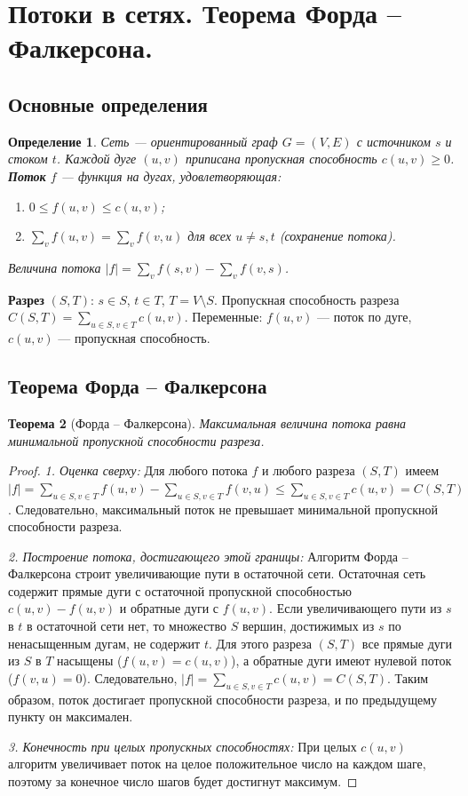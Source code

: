 \documentclass{article}
\theoremstyle{plain}
\newtheorem{theorem}{Теорема}[section]
\newtheorem{definition}[theorem]{Определение}
\begin{document}
\section{Потоки в сетях. Теорема Форда – Фалкерсона.}
\subsection{Основные определения}
\begin{definition}
Сеть — ориентированный граф $G=(V,E)$ с источником $s$ и стоком $t$. Каждой дуге $(u,v)$ приписана пропускная способность $c(u,v) \ge 0$. \textbf{Поток} $f$ — функция на дугах, удовлетворяющая:
\begin{enumerate}
\item $0 \le f(u,v) \le c(u,v)$;
\item $\sum_{v} f(u,v) = \sum_{v} f(v,u)$ для всех $u \neq s,t$ (сохранение потока).
\end{enumerate}
Величина потока $|f| = \sum_{v} f(s,v) - \sum_{v} f(v,s)$.
\end{definition}

\textbf{Разрез} $(S,T)$: $s \in S$, $t \in T$, $T = V \setminus S$. Пропускная способность разреза $C(S,T) = \sum_{u\in S, v\in T} c(u,v)$. Переменные: $f(u,v)$ — поток по дуге, $c(u,v)$ — пропускная способность.

\subsection{Теорема Форда – Фалкерсона}
\begin{theorem}[Форда – Фалкерсона]
Максимальная величина потока равна минимальной пропускной способности разреза.
\end{theorem}
\begin{proof}
\textit{1. Оценка сверху:} Для любого потока $f$ и любого разреза $(S,T)$ имеем $|f| = \sum_{u\in S, v\in T} f(u,v) - \sum_{u\in S, v\in T} f(v,u) \le \sum_{u\in S, v\in T} c(u,v) = C(S,T)$. Следовательно, максимальный поток не превышает минимальной пропускной способности разреза.

\textit{2. Построение потока, достигающего этой границы:} Алгоритм Форда – Фалкерсона строит увеличивающие пути в остаточной сети. Остаточная сеть содержит прямые дуги с остаточной пропускной способностью $c(u,v)-f(u,v)$ и обратные дуги с $f(u,v)$. Если увеличивающего пути из $s$ в $t$ в остаточной сети нет, то множество $S$ вершин, достижимых из $s$ по ненасыщенным дугам, не содержит $t$. Для этого разреза $(S,T)$ все прямые дуги из $S$ в $T$ насыщены ($f(u,v)=c(u,v)$), а обратные дуги имеют нулевой поток ($f(v,u)=0$). Следовательно, $|f| = \sum_{u\in S, v\in T} c(u,v) = C(S,T)$. Таким образом, поток достигает пропускной способности разреза, и по предыдущему пункту он максимален.

\textit{3. Конечность при целых пропускных способностях:} При целых $c(u,v)$ алгоритм увеличивает поток на целое положительное число на каждом шаге, поэтому за конечное число шагов будет достигнут максимум.
\end{proof}
\end{document}
